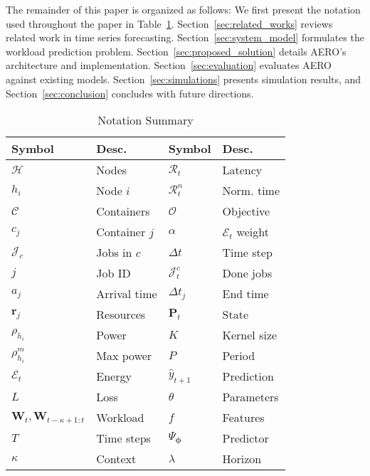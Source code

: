 \documentclass{ieeetmlcn}
\begin{document}
{\color{blue}
The remainder of this paper is organized as follows: We first present the notation used throughout the paper in Table~\ref{tab:notation}.} Section~\ref{sec:related_works} reviews related work in time series forecasting. Section~\ref{sec:system_model} formulates the workload prediction problem. Section~\ref{sec:proposed_solution} details AERO's architecture and implementation. Section~\ref{sec:evaluation} evaluates AERO against existing models. Section~\ref{sec:simulations} presents simulation results, and Section~\ref{sec:conclusion} concludes with future directions.




\begin{table}[!t]
\centering
\textcolor{blue}{
\caption{Notation Summary}
\label{tab:notation}
\begin{tabular}{|l|p{0.65in}|l|p{0.65in}|}
\hline
\textbf{Symbol} & \textbf{Desc.} & \textbf{Symbol} & \textbf{Desc.} \\
\hline
$\mathcal{H}$ & Nodes & $\mathcal{R}_t$ & Latency \\
$h_i$ & Node $i$ & $\mathcal{R}_t^n$ & Norm. time \\
$\mathcal{C}$ & Containers & $\mathcal{O}$ & Objective \\
$c_j$ & Container $j$ & $\alpha$ & $\mathcal{E}_t$ weight \\
$\mathcal{J}_c$ & Jobs in $c$ & $\Delta t$ & Time step \\
$j$ & Job ID & $\mathcal{J}_t^c$ & Done jobs \\
$a_j$ & Arrival time & $\Delta t_j$ & End time \\
$\mathbf{r}_j$ & Resources & $\mathbf{P}_t$ & State \\
$\rho_{h_i}$ & Power & $K$ & Kernel size \\
$\rho_{h_i}^m$ & Max power & $P$ & Period \\
$\mathcal{E}_t$ & Energy & $\hat{y}_{t+1}$ & Prediction \\
$L$ & Loss & $\theta$ & Parameters \\
$\mathbf{W}_t, \mathbf{W}_{t-\kappa+1:t}$ & Workload & $f$ & Features \\
$T$ & Time steps & $\Psi_{\boldsymbol{\phi}}$ & Predictor \\
$\kappa$ & Context & $\lambda$ & Horizon \\
\hline
\end{tabular}}
\end{table}
    
\end{document}
